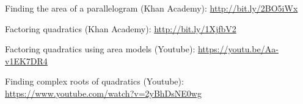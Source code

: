 \begin{readinessAssuranceResources}
\item Finding the area of a parallelogram (Khan Academy):
      \url{http://bit.ly/2BO5iWx}
\item Factoring quadratics (Khan Academy):
      \url{http://bit.ly/1XjfbV2}
\item Factoring quadratics using area models (Youtube): 
	\url{https://youtu.be/Aa-v1EK7DR4}
\item Finding complex roots of quadratics (Youtube):
      \url{https://www.youtube.com/watch?v=2yBhDsNE0wg}
\end{readinessAssuranceResources}

